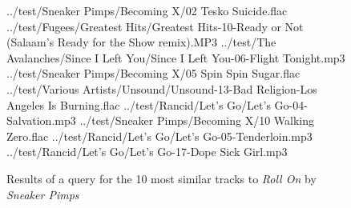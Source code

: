 \begin{figure}[!hb]
	\caption{Results of a query for the 10 most similar tracks to \emph{Roll On} by \emph{Sneaker Pimps}}
	\label{fig:testing:user:similarity:a}
	\begin{listing}{1}
../test/Sneaker Pimps/Becoming X/02 Tesko Suicide.flac
../test/Fugees/Greatest Hits/Greatest Hits-10-Ready or Not (Salaam's Ready for the Show remix).MP3
../test/The Avalanches/Since I Left You/Since I Left You-06-Flight Tonight.mp3
../test/Sneaker Pimps/Becoming X/05 Spin Spin Sugar.flac
../test/Various Artists/Unsound/Unsound-13-Bad Religion-Los Angeles Is Burning.flac
../test/Rancid/Let's Go/Let's Go-04-Salvation.mp3
../test/Sneaker Pimps/Becoming X/10 Walking Zero.flac
../test/Rancid/Let's Go/Let's Go-05-Tenderloin.mp3
../test/Rancid/Let's Go/Let's Go-17-Dope Sick Girl.mp3
\end{listing}
\end{figure}
